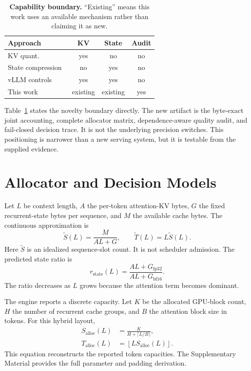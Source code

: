 \documentclass{article}
\begin{document}
\begin{table}[t]
\centering
\scriptsize
\caption{\textbf{Capability boundary.} ``Existing'' means this work uses an
available mechanism rather than claiming it as new.}
\label{tab:positioning}
\setlength{\tabcolsep}{2.5pt}
\begin{tabular}{@{}lccc@{}}
\toprule
Approach & KV & State & Audit\\
\midrule
KV quant.~\cite{kivi,kvquant} & yes & no & no\\
State compression~\cite{replayssm} & no & yes & no\\
vLLM controls~\cite{vllm,vllmpr22196} & yes & yes & no\\
This work & existing & existing & yes\\
\bottomrule
\end{tabular}
\end{table}

Table~\ref{tab:positioning} states the novelty boundary directly. The new
artifact is the byte-exact joint accounting, complete allocator matrix,
dependence-aware quality audit, and fail-closed decision trace. It is not the
underlying precision switches. This positioning is narrower than a new
serving system, but it is testable from the supplied evidence.

\section{Allocator and Decision Models}
\label{sec:model}

Let $L$ be context length, $A$ the per-token attention-KV bytes, $G$ the
fixed recurrent-state bytes per sequence, and $M$ the available cache bytes.
The continuous approximation is
\begin{equation}
  \widetilde{S}(L)=\frac{M}{A L+G}, \qquad
  \widetilde{T}(L)=L\widetilde{S}(L).
  \label{eq:continuous}
\end{equation}
Here $\widetilde{S}$ is an idealized sequence-slot count. It is not scheduler
admission. The predicted state ratio is
\begin{equation}
  r_{\mathrm{state}}(L)=
  \frac{A L+G_{\mathrm{fp32}}}{A L+G_{\mathrm{bf16}}}.
  \label{eq:rstate}
\end{equation}
The ratio decreases as $L$ grows because the attention term becomes dominant.

The engine reports a discrete capacity. Let $K$ be the allocated GPU-block
count, $H$ the number of recurrent cache groups, and $B$ the attention block
size in tokens. For this hybrid layout,
\begin{equation}
  \begin{aligned}
  S_{\mathrm{alloc}}(L) &= \frac{K}{H+\lceil L/B\rceil},\\
  T_{\mathrm{alloc}}(L) &=
    \left\lfloor L S_{\mathrm{alloc}}(L)\right\rfloor.
  \end{aligned}
  \label{eq:discrete}
\end{equation}
This equation reconstructs the reported token capacities. The Supplementary
Material provides the full parameter and padding derivation.
\end{document}
